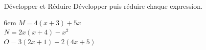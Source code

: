 \documentclass[a4paper]{book}
\begin{document}
    \vspace{0.5cm}
        
    \begin{exerciceTitre}{Développer et Réduire}
        Développer puis réduire chaque expression.
        \vspace{0.3cm}
        
        \begin{ZoneReponse}{6cm}
            $M = 4(x + 3) + 5x$ \\
            \vspace{0.2cm}
            $N = 2x(x + 4) - x^2$ \\
            \vspace{0.2cm}
            $O = 3(2x + 1) + 2(4x + 5)$
            \end{ZoneReponse}
    \end{exerciceTitre}
\end{document}

